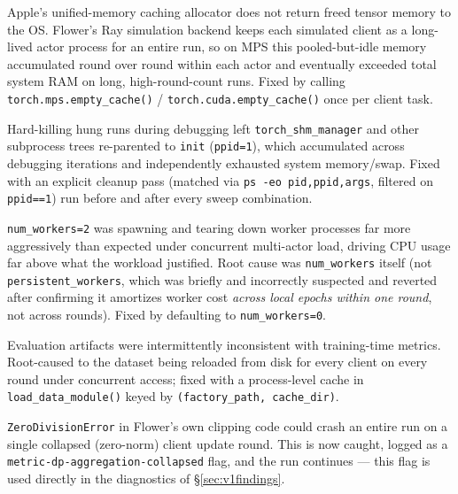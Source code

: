\documentclass[11pt]{article}
\newcommand{\code}[1]{\texttt{#1}}
\begin{document}
\begin{description}[leftmargin=1.4em,style=nextline]
    \item[Unified-memory leak (MPS).] Apple's unified-memory caching allocator does not return
    freed tensor memory to the OS. Flower's Ray simulation backend keeps each simulated client as a
    long-lived actor process for an entire run, so on MPS this pooled-but-idle memory accumulated
    round over round within each actor and eventually exceeded total system RAM on long,
    high-round-count runs. Fixed by calling \code{torch.mps.empty\_cache()} /
    \code{torch.cuda.empty\_cache()} once per client task.
    \item[Process orphaning.] Hard-killing hung runs during debugging left \code{torch\_shm\_manager}
    and other subprocess trees re-parented to \code{init} (\code{ppid=1}), which accumulated across
    debugging iterations and independently exhausted system memory/swap. Fixed with an explicit
    cleanup pass (matched via \code{ps -eo pid,ppid,args}, filtered on \code{ppid==1}) run before
    and after every sweep combination.
    \item[DataLoader worker churn.] \code{num\_workers=2} was spawning and tearing down worker
    processes far more aggressively than expected under concurrent multi-actor load, driving CPU
    usage far above what the workload justified. Root cause was \code{num\_workers} itself (not
    \code{persistent\_workers}, which was briefly and incorrectly suspected and reverted after
    confirming it amortizes worker cost \emph{across local epochs within one round}, not across
    rounds). Fixed by defaulting to \code{num\_workers=0}.
    \item[Per-round dataset-reload race.] Evaluation artifacts were intermittently inconsistent
    with training-time metrics. Root-caused to the dataset being reloaded from disk for every
    client on every round under concurrent access; fixed with a process-level cache in
    \code{load\_data\_module()} keyed by \code{(factory\_path, cache\_dir)}.
    \item[Uncaught aggregation crash.] \code{ZeroDivisionError} in Flower's own clipping code could
    crash an entire run on a single collapsed (zero-norm) client update round. This is now caught,
    logged as a \code{metric-dp-aggregation-collapsed} flag, and the run continues --- this flag is
    used directly in the diagnostics of \S\ref{sec:v1findings}.
\end{description}
\end{document}
